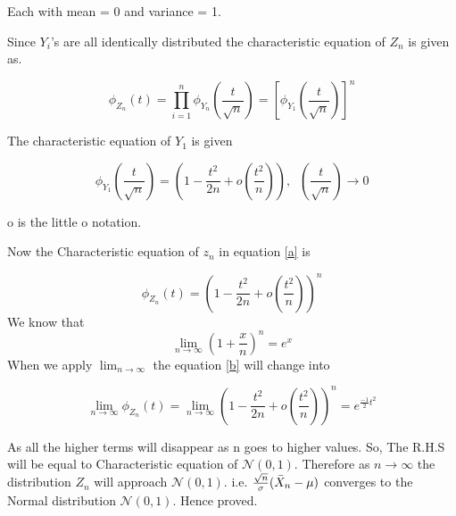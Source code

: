 \documentclass[10pt]{beamer}
\begin{document}
\begin{frame}{}
    Each with mean = 0 and variance = 1.

Since $Y_i$'s are all identically distributed the characteristic equation of $Z_n$ is given as.
\begin{block}{}
\begin{equation}
    \phi_{Z_n}(t) =\displaystyle \prod_{i=1}^n\phi_{Y_n}\left(\frac{t}{\sqrt{n}}\right) = \left[\phi_{Y_1}\left(\frac{t}{\sqrt{n}}\right)\right]^n
\end{equation}
\end{block}
The characteristic equation of $Y_1$ is given
\begin{block}{}
\begin{equation}
    \phi_{Y_1}\left(\frac{t}{\sqrt{n}}\right) = \left(1-\frac{t^2}{2n} + o\left(\frac{t^2}{n}\right)\right), \;\; \left(\frac{t}{\sqrt{n}}\right)\to 0 \label{b}
\end{equation}
\end{block}
o is the little o notation.

Now the Characteristic equation of $z_n$ in equation \eqref{a} is 
\end{frame}

\begin{frame}{}
    \begin{equation}
    \phi_{Z_n}(t) = \left( 1-\frac{t^2}{2n} + o\left(\frac{t^2}{n}\right) \right)^n
\end{equation}
We know that 
$$\lim_{n\to\infty} \left(1+\frac{x}{n}\right)^n = e^x$$
When we apply $\lim_{n\to\infty}$ the equation \eqref{b} will change into 
\begin{block}{}
\begin{equation}
    \lim_{n\to\infty}\phi_{Z_n}(t) =\lim_{n\to\infty}\left( 1-\frac{t^2}{2n} + o\left(\frac{t^2}{n}\right) \right)^n =  e^{\frac{-1}{2}t^2}
\end{equation}
\end{block}
As all the higher terms will disappear as n goes to higher values.
So, The R.H.S will be equal to Characteristic equation of $\mathcal{N}(0,1)$.
Therefore as $n\to\infty$ the distribution $Z_n$ will approach $\mathcal{N}(0,1)$.
i.e. $\frac{\sqrt{n}}{\sigma}(\Bar{X}_n - \mu) $ converges to the Normal distribution $\mathcal{N}(0,1)$.
Hence proved.
\end{frame}
\end{document}

